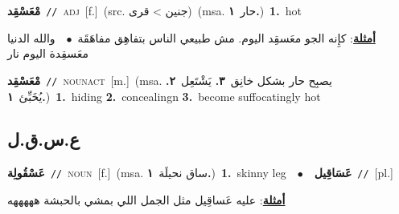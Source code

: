 \documentclass[10pt,a4paper,twoside]{article} %
\begin{document}
\begin{multicols}{2}
{\setlength\topsep{0pt}\textbf{\foreignlanguage{arabic}{مْعَسْقِد}}\ {\color{gray}\texttt{//}\color{black}}\ \textsc{adj}\ [f.]\ (src. \color{gray}\foreignlanguage{arabic}{جنين > قرى}\color{black})\ \color{gray}(msa. \foreignlanguage{arabic}{حار}~\foreignlanguage{arabic}{\textbf{١.}})\color{black}\ \textbf{1.}~hot\  \begin{flushright}\color{gray}\foreignlanguage{arabic}{\textbf{\underline{\foreignlanguage{arabic}{أمثلة}}}: كإِنه الجو معَسقِد اليوم. مش طبيعي الناس بتفاهِق مفاهَقَة\ $\bullet$\ \  والله الدنيا معَسقِدة اليوم نار}\end{flushright}\color{black}} \vspace{2mm}

{\setlength\topsep{0pt}\textbf{\foreignlanguage{arabic}{مْعَسْقِد}}\ {\color{gray}\texttt{//}\color{black}}\ \textsc{noun\textunderscore act}\ [m.]\ \color{gray}(msa. \foreignlanguage{arabic}{يصبِح حار بشكل خانِق}~\foreignlanguage{arabic}{\textbf{٣.}}  \foreignlanguage{arabic}{يَشْتَعِل}~\foreignlanguage{arabic}{\textbf{٢.}}  \foreignlanguage{arabic}{يُخَبِّئ}~\foreignlanguage{arabic}{\textbf{١.}})\color{black}\ \textbf{1.}~hiding  \textbf{2.}~concealingn  \textbf{3.}~become suffocatingly hot\ } \vspace{2mm}

\vspace{-3mm}
\subsection*{\color{blue}\foreignlanguage{arabic}{ع.س.ق.ل}\color{blue}{}} 

{\setlength\topsep{0pt}\textbf{\foreignlanguage{arabic}{عَسْقُولِة}}\ {\color{gray}\texttt{//}\color{black}}\ \textsc{noun}\ [f.]\ \color{gray}(msa. \foreignlanguage{arabic}{ساق نحيلَة}~\foreignlanguage{arabic}{\textbf{١.}})\color{black}\ \textbf{1.}~skinny leg\ \ $\bullet$\ \ \setlength\topsep{0pt}\textbf{\foreignlanguage{arabic}{عَسَاقِيل}}\ {\color{gray}\texttt{//}\color{black}}\ [pl.]\  \begin{flushright}\color{gray}\foreignlanguage{arabic}{\textbf{\underline{\foreignlanguage{arabic}{أمثلة}}}: عليه عَساقِيل مثل الجمل اللي بمشي بالحبشة هههههه}\end{flushright}\color{black}} \vspace{2mm}


\end{multicols}
\end{document}

